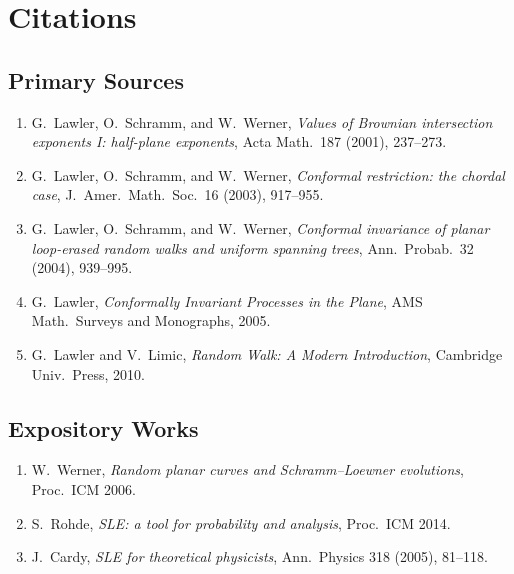 \section{Citations}\subsection*{Primary Sources}
\begin{enumerate}
    \item G.\ Lawler, O.\ Schramm, and W.\ Werner, \textit{Values of Brownian intersection exponents I: half-plane exponents}, Acta Math.\ 187 (2001), 237--273.
    \item G.\ Lawler, O.\ Schramm, and W.\ Werner, \textit{Conformal restriction: the chordal case}, J.\ Amer.\ Math.\ Soc.\ 16 (2003), 917--955.
    \item G.\ Lawler, O.\ Schramm, and W.\ Werner, \textit{Conformal invariance of planar loop-erased random walks and uniform spanning trees}, Ann.\ Probab.\ 32 (2004), 939--995.
    \item G.\ Lawler, \textit{Conformally Invariant Processes in the Plane}, AMS Math.\ Surveys and Monographs, 2005.
    \item G.\ Lawler and V.\ Limic, \textit{Random Walk: A Modern Introduction}, Cambridge Univ.\ Press, 2010.
\end{enumerate}

\subsection*{Expository Works}
\begin{enumerate}
    \item W.\ Werner, \textit{Random planar curves and Schramm--Loewner evolutions}, Proc.\ ICM 2006.
    \item S.\ Rohde, \textit{SLE: a tool for probability and analysis}, Proc.\ ICM 2014.
    \item J.\ Cardy, \textit{SLE for theoretical physicists}, Ann.\ Physics 318 (2005), 81--118.
\end{enumerate}

